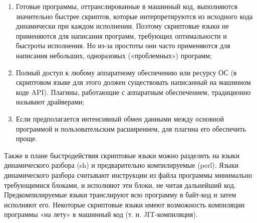 \begin{enumerate}
\item Готовые программы, оттранслированные в машинный код, выполняются значительно быстрее скриптов, которые интерпретируются из исходного кода динамически при каждом исполнении. Поэтому скриптовые языки не применяются для написания программ, требующих оптимальности и быстроты исполнения. Но из-за простоты они часто применяются для написания небольших, одноразовых («проблемных») программ;
\item Полный доступ к любому аппаратному обеспечению или ресурсу ОС (в скриптовом языке для этого должен существовать написанный на машинном коде API). Плагины, работающие с аппаратным обеспечением, традиционно называют драйверами;
\item Если предполагается интенсивный обмен данными между основной программой и пользовательским расширением, для плагина его обеспечить проще.
\end{enumerate}

Также в плане быстродействия скриптовые языки можно разделить на языки динамического разбора (sh) и предварительно компилируемые (perl). Языки динамического разбора считывают инструкции из файла программы минимально требующимися блоками, и исполняют эти блоки, не читая дальнейший код. Предкомпилируемые языки транслируют всю программу в байт-код и затем исполняют его. Некоторые скриптовые языки имеют возможность компиляции программы «на лету» в машинный код (т. н. JIT-компиляция).